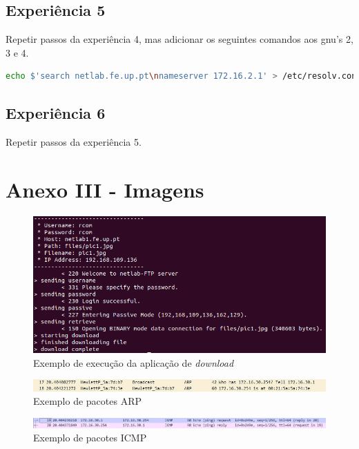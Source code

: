 \documentclass[article, a4paper, 11pt, oneside]{memoir}
\begin{document}
\subsection{Experiência 5} \label{exp5-conf}

Repetir passos da experiência 4, mas adicionar os seguintes comandos aos gnu's 2, 3 e 4.
\begin{lstlisting}[language=bash]
  echo $'search netlab.fe.up.pt\nnameserver 172.16.2.1' > /etc/resolv.conf
\end{lstlisting}

\subsection{Experiência 6} \label{exp6-conf}

Repetir passos da experiência 5.

\newpage

\section{Anexo III - Imagens}

\begin{figure}[htbp]  \label{app}
  \centering        
  \includegraphics[scale=0.5]{img/app.png}
  \caption{Exemplo de execução da aplicação de \textit{download}}
\end{figure}

\begin{figure}[htbp]  \label{exp1-arp}
  \centering        
  \includegraphics[scale=0.8]{img/exp1-arp.jpg}
  \caption{Exemplo de pacotes ARP}
\end{figure}

\begin{figure}[htbp]  \label{exp1-icmp}
  \centering        
  \includegraphics[scale=0.65]{img/exp1-icmp.jpg}
  \caption{Exemplo de pacotes ICMP}
\end{figure}
\end{document}
